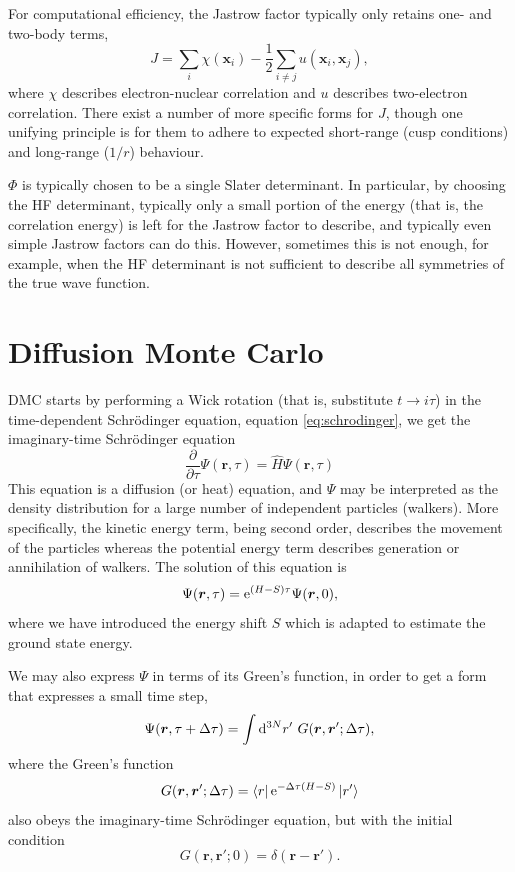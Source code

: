 For computational efficiency, the Jastrow factor typically only retains one- and two-body terms,
\begin{equation}
    J = \sum_i \chi(\bm x_i) - \frac 12 \sum_{i\neq j} u(\bm x_i, \bm x_j),
\end{equation}
where $\chi$ describes electron-nuclear correlation and $u$ describes two-electron correlation. There exist a number of more specific forms for $J$, though one unifying principle is for them to adhere to expected short-range (cusp conditions) and long-range ($1/r$) behaviour.

$\Phi$ is typically chosen to be a single Slater determinant. In particular, by choosing the \gls{HF} determinant, typically only a small portion of the energy (that is, the correlation energy) is left for the Jastrow factor to describe, and typically even simple Jastrow factors can do this. However, sometimes this is not enough, for example, when the HF determinant is not sufficient to describe all symmetries of the true wave function.

\section{Diffusion Monte Carlo}
\Gls{DMC} starts by performing a Wick rotation (that is, substitute $t\to i\tau$) in the time-dependent Schr\"odinger equation, equation \ref{eq:schrodinger}, we get the imaginary-time Schr\"odinger equation
\begin{equation}
    \label{eq:imag_time_schrodinger}
    \frac{\partial}{\partial\tau}\Psi(\bm r, \tau) = \hat H \Psi(\bm r, \tau)
\end{equation}
This equation is a diffusion (or heat) equation, and $\Psi$ may be interpreted as the density distribution for a large number of independent particles (walkers). More specifically, the kinetic energy term, being second order, describes the movement of the particles whereas the potential energy term describes generation or annihilation of walkers. The solution of this equation is
\begin{equation}
    \Psi(\bm r, \tau) = \mathrm{e}^{(H-S)\tau}\Psi(\bm r, 0),
\end{equation}
where we have introduced the energy shift $S$ which is adapted to estimate the ground state energy.

We may also express $\Psi$ in terms of its Green's function, in order to get a form that expresses a small time step,
\begin{equation}
\Psi(\bm r, \tau+\Delta\tau) = \int\mathrm{d}^{3N}r' \ G(\bm r, \bm r'; \Delta\tau),
\end{equation}
where the Green's function
\begin{equation}
G(\bm r, \bm r'; \Delta\tau) = \bra{r}\mathrm{e}^{-\Delta\tau(H-S)}\ket{r'}
\end{equation}
also obeys the imaginary-time Schr\"odinger equation, but with the initial condition
\begin{equation}
    G(\bm r, \bm r'; 0) = \delta(\bm r-\bm r').
\end{equation}

